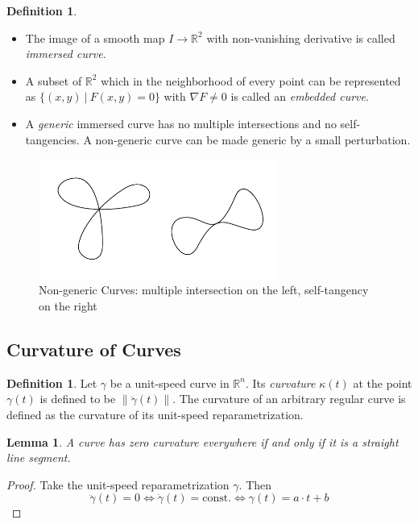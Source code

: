 \documentclass[a4paper,11pt,notitlepage,fullpage]{paper}
\theoremstyle{plain}
\newtheorem{lem}[thm]{Lemma}
\theoremstyle{definition}
\newtheorem{defn}[thm]{Definition} %
\begin{document}
\begin{defn}
\begin{itemize}
\item The image of a smooth map $I \to \mathbb R^2$ with non-vanishing derivative is called \emph{immersed curve}.

\item A subset of $\mathbb R^2$ which in the neighborhood of every point can be represented as $\{(x,y) ~|~ F(x,y) = 0\}$ with $\nabla F \neq 0$ is called an \emph{embedded curve}.

\item A \emph{generic} immersed curve has no multiple intersections and no self-tangencies. A non-generic curve can be made generic by a small perturbation.
\end{itemize}
\end{defn}

\begin{figure}[H]
\centering
\includegraphics[width = 0.7\textwidth]{img/nongeneric}
\caption{Non-generic Curves: multiple intersection on the left, self-tangency on the right}
\label{fig:non-generic}
\end{figure}


\subsection{Curvature of Curves}

\begin{defn}
Let $\gamma$ be a unit-speed curve in $\mathbb R^n$. Its \emph{curvature} $\kappa(t)$ at the point $\gamma(t)$ is  defined to be $\left\| \ddot\gamma(t)\right\|$. The curvature of an arbitrary regular curve is defined as the curvature of  its unit-speed reparametrization.
\end{defn}

\begin{lem}
A curve has zero curvature everywhere if and only if it is a straight line segment.
\end{lem}
\begin{proof} Take the unit-speed reparametrization $\gamma$. Then 
\begin{equation*}
\ddot\gamma(t) = 0 \Leftrightarrow \dot\gamma(t) = \text{const.} \Leftrightarrow \gamma(t) = a\cdot t+b
\end{equation*}
\end{proof}
\end{document}
